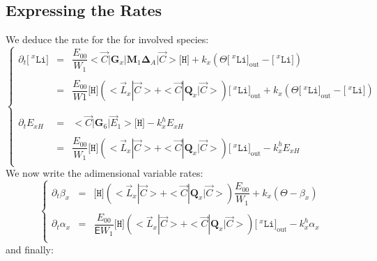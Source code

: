 \documentclass[aps,onecolumn,11pt]{revtex4}
\newcommand{\mychem}[1]{\mathtt{#1}}
\newcommand{\myconc}[1]{\big[#1\big]}
\newcommand{\spLi}[1]{{\!~^{#1}\mychem{Li}}}
\newcommand{\Li}[1]{\myconc{\spLi{#1}}}
\newcommand{\spproton}{\mychem{H}}
\newcommand{\proton}{\myconc{\spproton}}
\newcommand{\myout}[1]{{#1}_{\mathrm{out}}}
\newcommand{\LiOut}[1]{\myout{\Li{#1}}}
\newcommand{\mymat}[1]{{\bm{#1}}}
\begin{document}
\subsection{Expressing the Rates}
We deduce the rate for the for involved species:
\begin{equation}
\left\lbrace
\begin{array}{rcl}
\partial_t \Li{x} & = & \dfrac{E_{00}}{W_1}<\vec{C}|\mymat{G}_x|\mymat{M}_1\mymat{\Delta}_A|\vec{C}> \proton+ k_x\left(\Theta \LiOut{x} - \Li{x}\right)\\
\\
 & = & \dfrac{E_{00}}{W1} \proton \left( <\vec{L}_x|\vec{C}> + <\vec{C}|\mymat{Q}_x|\vec{C}>\right) \LiOut{x}+ k_x\left(\Theta \LiOut{x} - \Li{x}\right)\\
 \\
 \\
 \partial_t E_{xH} & = & <\vec{C}|\mymat{G}_6|\vec{E}_1> \proton - k_x^h E_{xH}\\
 \\
 & = & \dfrac{E_{00}}{W_1} \proton \left( <\vec{L}_x|\vec{C}> + <\vec{C}|\mymat{Q}_x|\vec{C}>\right) \LiOut{x} - k_x^h E_{xH} \\
\end{array}
\right.
\end{equation}
We now write the adimensional variable rates:
\begin{equation}
\left\lbrace
\begin{array}{rcl}
	\partial_t \beta_x & = & \proton \left( <\vec{L}_x|\vec{C}> + <\vec{C}|\mymat{Q}_x|\vec{C}> \right)  \dfrac{E_{00}}{W_1} + k_x \left(\Theta - \beta_x\right)\\
	\\
	\partial_t \alpha_{x} & = &  \dfrac{E_{00}}{\mathsf{E}W_1} \proton \left( <\vec{L}_x|\vec{C}> + <\vec{C}|\mymat{Q}_x|\vec{C}>\right) \LiOut{x} - k_x^h \alpha_{x}\\
\end{array}
\right.
\end{equation}
and finally:
\end{document}
